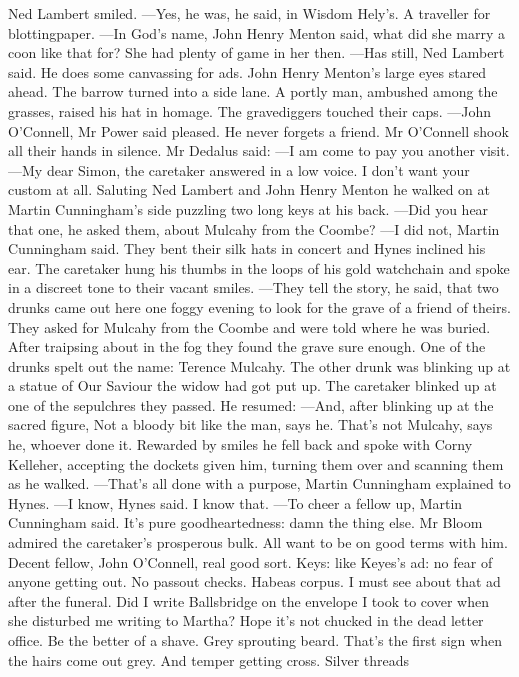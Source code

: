 \documentclass{article}
\begin{document}
Ned Lambert smiled.
—Yes, he was, he said, in Wisdom Hely’s. A traveller for
blottingpaper.
—In God’s name, John Henry Menton said, what did she marry a coon
like that for? She had plenty of game in her then.
—Has still, Ned Lambert said. He does some canvassing for ads.
John Henry Menton’s large eyes stared ahead.
The barrow turned into a side lane. A portly man, ambushed among the
grasses, raised his hat in homage. The gravediggers touched their caps.
—John O’Connell, Mr Power said pleased. He never forgets a friend.
Mr O’Connell shook all their hands in silence. Mr Dedalus said:
—I am come to pay you another visit.
—My dear Simon, the caretaker answered in a low voice. I don’t want
your custom at all.
Saluting Ned Lambert and John Henry Menton he walked on at Martin
Cunningham’s side puzzling two long keys at his back.
—Did you hear that one, he asked them, about Mulcahy from the Coombe?
—I did not, Martin Cunningham said.
They bent their silk hats in concert and Hynes inclined his ear. The
caretaker hung his thumbs in the loops of his gold watchchain and spoke
in a discreet tone to their vacant smiles.
—They tell the story, he said, that two drunks came out here one foggy
evening to look for the grave of a friend of theirs. They asked for
Mulcahy from the Coombe and were told where he was buried. After
traipsing about in the fog they found the grave sure enough. One of the
drunks spelt out the name: Terence Mulcahy. The other drunk was blinking
up at a statue of Our Saviour the widow had got put up.
The caretaker blinked up at one of the sepulchres they passed. He
resumed:
—And, after blinking up at the sacred figure, Not a bloody bit like
the man, says he. That’s not Mulcahy, says he, whoever done it.
Rewarded by smiles he fell back and spoke with Corny Kelleher, accepting
the dockets given him, turning them over and scanning them as he walked.
—That’s all done with a purpose, Martin Cunningham explained to
Hynes.
—I know, Hynes said. I know that.
—To cheer a fellow up, Martin Cunningham said. It’s pure
goodheartedness: damn the thing else.
Mr Bloom admired the caretaker’s prosperous bulk. All want to be on
good terms with him. Decent fellow, John O’Connell, real good sort.
Keys: like Keyes’s ad: no fear of anyone getting out. No passout
checks. Habeas corpus. I must see about that ad after the funeral. Did I
write Ballsbridge on the envelope I took to cover when she disturbed me
writing to Martha? Hope it’s not chucked in the dead letter office.
Be the better of a shave. Grey sprouting beard. That’s the first sign
when the hairs come out grey. And temper getting cross. Silver threads
\end{document}

